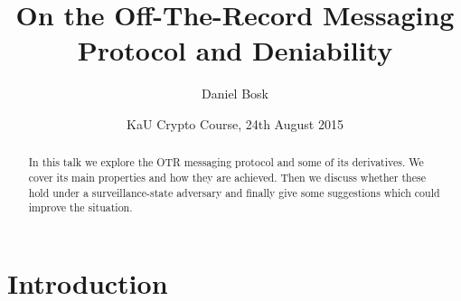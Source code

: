 \title[Deniability of OTR]{%
  On the Off-The-Record Messaging Protocol
  and Deniability
}
\author[D.~Bosk]{%
  Daniel Bosk
}
\date[kaucrypt 2015]{%
  KaU Crypto Course,
  24th August 2015
}


\mode* %

\begin{abstract}
  In this talk we explore the \ac{OTR} messaging protocol and some of its 
  derivatives.
  We cover its main properties and how they are achieved.
  Then we discuss whether these hold under a surveillance-state adversary and 
  finally give some suggestions which could improve the situation.

\end{abstract}




\acresetall{}
\section{Introduction}

